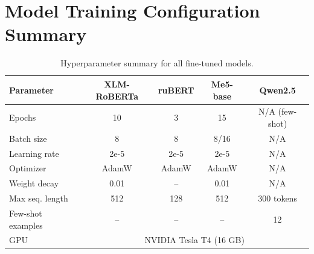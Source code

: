 \section{Model Training Configuration Summary}

\begin{table}[H]
\centering
\caption{Hyperparameter summary for all fine-tuned models.}
\label{tab:hyperparams}
\renewcommand{\arraystretch}{1.3}
\begin{tabular}{lcccc}
\toprule
\textbf{Parameter} & \textbf{XLM-RoBERTa} & \textbf{ruBERT} & \textbf{Me5-base} & \textbf{Qwen2.5} \\
\midrule
Epochs          & 10  & 3   & 15  & N/A (few-shot) \\
Batch size      & 8   & 8   & 8/16 & N/A \\
Learning rate   & 2e-5 & 2e-5 & 2e-5 & N/A \\
Optimizer       & AdamW & AdamW & AdamW & N/A \\
Weight decay    & 0.01 & --  & 0.01 & N/A \\
Max seq. length & 512 & 128 & 512 & 300 tokens \\
Few-shot examples & -- & -- & -- & 12 \\
GPU             & \multicolumn{4}{c}{NVIDIA Tesla T4 (16 GB)} \\
\bottomrule
\end{tabular}
\end{table}
